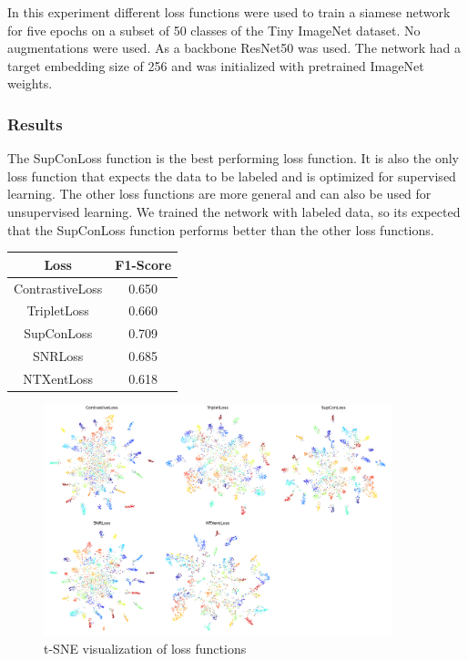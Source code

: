 \documentclass[12pt,a4paper]{report}
\newcommand{\splitlayout}[2]{
	\begin{minipage}{0.6\textwidth}
		#1
	\end{minipage}
	\hfill
	\begin{minipage}{0.35\textwidth}
		#2
	\end{minipage}	
}
\begin{document}
In this experiment different loss functions were used to train a siamese network for five epochs on a subset of 50 classes of the Tiny ImageNet dataset.
No augmentations were used.
As a backbone ResNet50 was used.
The network had a target embedding size of 256 and was initialized with pretrained ImageNet weights.


\subsubsection{Results}

\splitlayout{
	The SupConLoss function is the best performing loss function.
	It is also the only loss function that expects the data to be labeled and is optimized for supervised learning.
	The other loss functions are more general and can also be used for unsupervised learning.
	We trained the network with labeled data, so its expected that the SupConLoss function performs better than the other loss functions.
}{
	\begin{tabular}{ | c | c | }
		\hline
		Loss & F1-Score \\ 
		\hline
		ContrastiveLoss & 0.650 \\ 
		\hline
		TripletLoss & 0.660 \\ 
		\hline
		SupConLoss & 0.709 \\ 
		\hline
		SNRLoss & 0.685 \\ 
		\hline
		NTXentLoss & 0.618 \\ 
		\hline
	\end{tabular}
}

\begin{figure}[hb]
	\centering
	\includegraphics[width=0.9\textwidth]{../plots/losses.png}
	\caption{t-SNE visualization of loss functions}
\end{figure}
\end{document}
